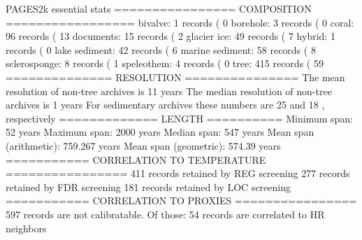 PAGES2k essential stats
================ COMPOSITION =================
bivalve:  1  records (   0 %
borehole:  3  records (   0 %
coral:  96  records (  13 %
documents:  15  records (   2 %
glacier ice:  49  records (   7 %
hybrid:  1  records (   0 %
lake sediment:  42  records (   6 %
marine sediment:  58  records (   8 %
sclerosponge:  8  records (   1 %
speleothem:  4  records (   0 %
tree:  415  records (  59 %
============== RESOLUTION ===============
The  mean resolution of non-tree archives is  11 years
The  median resolution of non-tree archives is    1 years
For sedimentary archives these numbers are   25  and   18 , respectively
============= LENGTH  ==========
Minimum span: 52  years
Maximum span: 2000  years
Median span: 547  years
Mean span (arithmetic): 759.267  years
Mean span (geometric): 574.39  years
=========== CORRELATION TO TEMPERATURE ================
411  records retained by REG screening
277  records retained by FDR screening
181  records retained by LOC screening
=========== CORRELATION TO PROXIES ================
597  records are not calibratable. Of those:
54  records are correlated to HR neighbors
